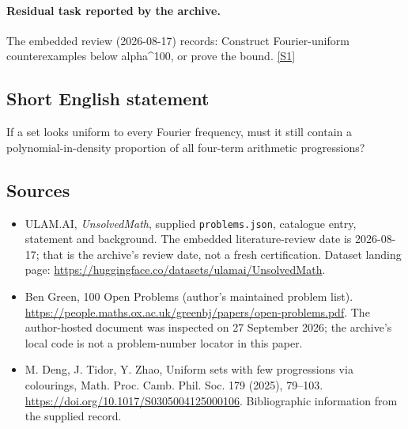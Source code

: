 \documentclass[11pt,a4paper]{article}
\newcommand{\sref}[2]{\hyperlink{source:#1:#2}{[S#2]}}
\begin{document}
\paragraph{Residual task reported by the archive.}

The embedded review (2026-08-17) records: Construct Fourier-uniform counterexamples below alpha\textasciicircum{}100, or prove the bound. \sref{statement}{1}

\subsection{Short English statement}

If a set looks uniform to every Fourier frequency, must it still contain a polynomial-in-density proportion of all four-term arithmetic progressions?

\subsection{Sources}

{\small

\begin{itemize}

\item[\hypertarget{source:statement:1}{S1}] ULAM.AI, \emph{UnsolvedMath}, supplied \texttt{problems.json}, catalogue entry, statement and background. The embedded literature-review date is 2026-08-17; that is the archive’s review date, not a fresh certification. Dataset landing page: \url{https://huggingface.co/datasets/ulamai/UnsolvedMath}.

\item[\hypertarget{source:statement:2}{S2}] Ben Green, 100 Open Problems (author’s maintained problem list). \url{https://people.maths.ox.ac.uk/greenbj/papers/open-problems.pdf}. The author-hosted document was inspected on 27 September 2026; the archive’s local code is not a problem-number locator in this paper.

\item[\hypertarget{source:statement:3}{S3}] M. Deng, J. Tidor, Y. Zhao, Uniform sets with few progressions via colourings, Math. Proc. Camb. Phil. Soc. 179 (2025), 79--103. \url{https://doi.org/10.1017/S0305004125000106}. Bibliographic information from the supplied record.

\end{itemize}

}

\label{end:statement}
\end{document}
